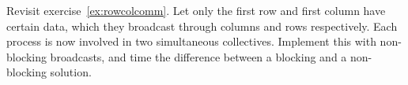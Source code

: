   \label{ex:procgridnonblock}
  Revisit exercise~\ref{ex:rowcolcomm}. Let only the first row and
  first column have certain data, which they broadcast through columns
  and rows respectively. Each process is now involved in two
  simultaneous collectives. Implement this with non-blocking
  broadcasts, and time the difference between a blocking and a
  non-blocking solution.
